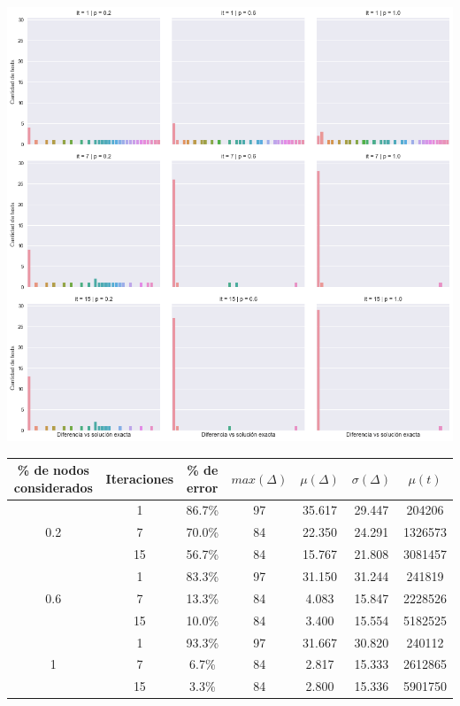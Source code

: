 \begin{center}
    \includegraphics[scale=0.6]{img/path-grasp-3x3.png}

    \begin{tabular}{ | c | c | c | c | c | c | c |}
        \hline
        \% de nodos considerados & Iteraciones & \% de error & $max(\Delta)$ & $\mu(\Delta)$ & $\sigma(\Delta)$ & $\mu(t)$ \\ \hline
            & 1  & 86.7\% & 97 & 35.617 & 29.447 &  204206 \\ \cline{2-7}
        0.2 & 7  & 70.0\% & 84 & 22.350 & 24.291 & 1326573 \\ \cline{2-7}
            & 15 & 56.7\% & 84 & 15.767 & 21.808 & 3081457 \\ \hline
            & 1  & 83.3\% & 97 & 31.150 & 31.244 &  241819 \\ \cline{2-7}
        0.6 & 7  & 13.3\% & 84 &  4.083 & 15.847 & 2228526 \\ \cline{2-7}
            & 15 & 10.0\% & 84 &  3.400 & 15.554 & 5182525 \\ \hline
            & 1  & 93.3\% & 97 & 31.667 & 30.820 &  240112 \\ \cline{2-7}
        1   & 7  &  6.7\% & 84 &  2.817 & 15.333 & 2612865 \\ \cline{2-7}
            & 15 &  3.3\% & 84 &  2.800 & 15.336 & 5901750 \\
        \hline
    \end{tabular}
\end{center}

